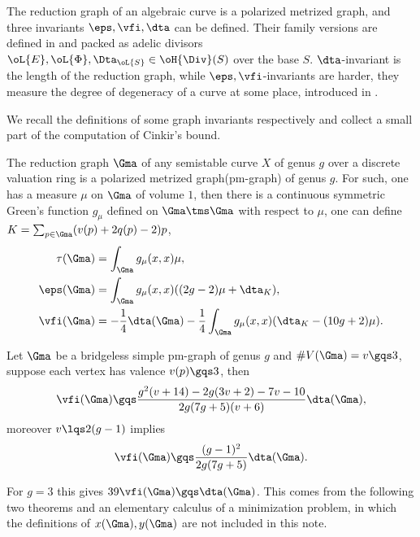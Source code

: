 \documentclass[article, a4paper, twoside]{universal}
\begin{document}

The reduction graph of an algebraic curve is a polarized metrized graph, and three invariants $\eps, \vfi, \dta$ can be defined. Their family versions are defined in \cite{Yuan2021Bigness} and packed as adelic divisors $\oL{E},\oL{\Phi},\Dta_{\oL{S}}\in\oH{\Div}(S)$ over the base $S$. $\dta$-invariant is the length of the reduction graph, while $\eps,\vfi$-invariants are harder, they measure the degree of degeneracy of a curve at some place, introduced in \cite{Zhang1993,Zhang2010GrossSchoen}.


We recall the definitions of some graph invariants respectively and collect a small part of the computation of Cinkir's bound\cite{Cinkir2011}.

\begin{dfn}
	The reduction graph $\Gma$ of any semistable curve $X$ of genus $g$ over a discrete valuation ring is a polarized metrized graph(pm-graph) of genus $g$. For such, one has a measure $\mu$ on $\Gma$ of volume $1$, then there is a continuous symmetric Green's function $g_{\mu}$ defined on $\Gma\tms\Gma$ with respect to $\mu$, one can define $K=\sum_{p\in\Gma}(v(p)+2q(p)-2)p$,
	\begin{align*}
	  \tau(\Gma)&=\int_{\Gma}g_{\mu}(x,x)\mu,\\
	  \eps(\Gma)&=\int_{\Gma}g_{\mu}(x,x)((2g-2)\mu+\dta_{K}),\\
	  \vfi(\Gma)&=-\frac{1}{4}\dta(\Gma)-\frac{1}{4}\int_{\Gma}g_{\mu}(x,x)(\dta_{K}-(10g+2)\mu).\\
	\end{align*}
\end{dfn}


\begin{thm}
	Let $\Gma$ be a bridgeless simple pm-graph of genus $g$ and $\#V(\Gma)=v\gqs3$, suppose each vertex has valence $v(p)\gqs3$, then
	\[
		\vfi(\Gma)\gqs\frac{g^{2}(v+14)-2g(3v+2)-7v-10}{2g(7g+5)(v+6)}\dta(\Gma),
	\]
	moreover $v\lqs2(g-1)$ implies
	\[
		\vfi(\Gma)\gqs\frac{(g-1)^{2}}{2g(7g+5)}\dta(\Gma).
	\]
\end{thm}

\begin{rmk}
	For $g=3$ this gives $39\vfi(\Gma)\gqs\dta(\Gma)$. This comes from the following two theorems and an elementary calculus of a minimization problem, in which the definitions of $x(\Gma),y(\Gma)$ are not included in this note.
\end{rmk}
\end{document}
